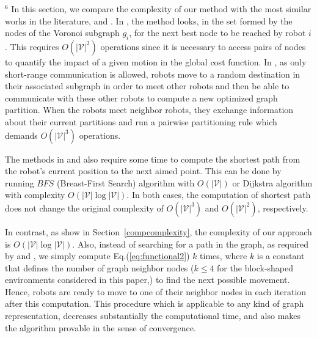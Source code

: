 \documentclass[smallcondensed]{svjour3}
\begin{document}
{\color{blue}$^6$
In this section, we compare the complexity of our method with the most similar works in the literature, \citep{Durham2012} and \citep{Yun2013}. 
%
In \cite{Yun2013}, the method looks, in the set formed by the nodes of the Voronoi subgraph $g_i$, for the next best node to be reached by robot $i$.  This requires $O(|\mathcal{V}|^2)$ operations since it is necessary to access pairs of nodes to quantify the impact of a given motion in the global cost function. 
%
In \citep{Durham2012}, as only short-range communication is allowed, robots move to a random destination in their associated subgraph in order to meet other robots and then be able to communicate with these other robots to compute a new optimized graph partition. When the robots meet neighbor robots, they exchange information about their current partitions and run a pairwise partitioning rule which demands $O(|\mathcal{V}|^3)$ operations. %

The methods in \citep{Durham2012} and \citep{Yun2013} also require some time to compute the shortest path from the robot's current position to the next aimed point. This can be done by running $BFS$ (Breast-First Search) algorithm with $O(|\mathcal{V}|)$ or Dijkstra algorithm with complexity $O(|\mathcal{V}| \log |\mathcal{V}|)$. In both cases, the computation of shortest path does not change the original complexity of $O(|\mathcal{V}|^3)$ and $O(|\mathcal{V}|^2)$, respectively.

 In contrast, as show in Section~\ref{compcomplexity}, the complexity of our approach is $O(|\mathcal{V}| \log |\mathcal{V}|)$. Also, instead of searching for a path in the graph, as required by \citep{Durham2012} and \citep{Yun2013}, we simply compute Eq.(\ref{eq:functional2}) $k$ times, where $k$ is a constant that defines the number of graph neighbor nodes ($k \leq 4$ for the block-shaped environments considered in this paper,) to find the next possible movement. Hence, robots are ready to move to one of their neighbor nodes in each iteration after this computation. This procedure which is applicable to any kind of graph representation, decreases substantially the computational time, and also makes the algorithm provable in the sense of convergence.

}
\end{document}
